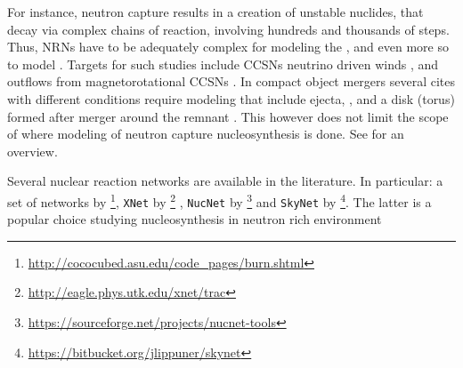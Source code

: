 %
%
For instance, neutron capture results in a creation of unstable nuclides, 
that decay via complex chains of reaction, involving hundreds and thousands of steps. 
Thus, \acp{NRN} have to be adequately complex for modeling 
the \sproc{}, \citep[\eg][]{Prantzos:1990,Kaeppeler:2011,Nishimura:2017zdi} 
and even more so to model \rproc{}. 
%
Targets for such studies include 
\acp{CCSN} neutrino driven winds \citep[\eg][]{Woosley:1992,Arcones:2010,Wanajo:2013},
and outflows from magnetorotational \acp{CCSN} \citep[\eg][]{Winteler:2012,Nishimura:2015nca}.
In compact object mergers several cites with different conditions 
require modeling that include ejecta,
\citep{Goriely:2011vg,Bauswein:2013yna,Wanajo:2014wha,Just:2014fka,Fernandez:2016sbf}\red{[Refs]}, 
and a disk (torus) formed after merger around the remnant 
\citep{Surman:2008qf,Perego:2014fma,Martin:2015hxa,Lippuner:2017tyn}.
%
This however does not limit the scope of where modeling of neutron capture nucleosynthesis is done. 
See \citep[\eg][]{Blinnikov:1996,Panov:1995,Panov:2001,Mumpower:2011ar} for an overview.

Several nuclear reaction networks are available in the literature. 
In particular: a set of networks by 
\citet{Timmes:1999}\footnote{\url{http://cococubed.asu.edu/code_pages/burn.shtml}}, 
\texttt{XNet} by \citet{Hix:1999}\footnote{\url{http://eagle.phys.utk.edu/xnet/trac}} , 
\texttt{NucNet} by \citet{Meyer:2007}\footnote{\url{https://sourceforge.net/projects/nucnet-tools}}
and \texttt{SkyNet} by \citet{Lippuner:2015gwa}\footnote{\url{https://bitbucket.org/jlippuner/skynet}}.
%
The latter is a popular choice studying nucleosynthesis in neutron rich environment
\citep{Lippuner:2015gwa,Radice:2016dwd,Roberts:2016igt,Lippuner:2017tyn,Siegel:2017nub,Vlasov:2017nou,Fernandez:2016sbf}



